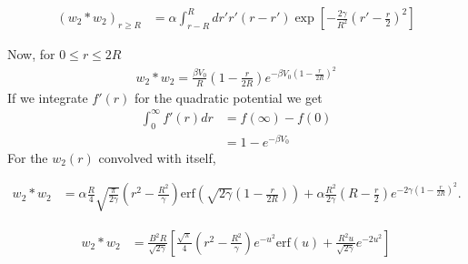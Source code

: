 \documentclass[letterpaper,twocolumn,amsmath,amssymb,prb]{revtex4-1}
\begin{document}
\begin{align}
(w_2 \ast w_2)_{r \geq R} &= \alpha \int_{r - R}^R dr' r'(r-r') \exp \left [ -
   \frac {2\gamma}{R^2}\left( r' - \frac{r}{2} \right)^2 \right]
\end{align}

Now, for $ 0 \leq r \leq 2R$
\begin{align}
  w_2 \ast w_2 = \frac{\beta V_0}{R} \left( 1 - \frac{r}{2R} \right)
              e^{-\beta V_0 \left( 1 - \frac{r}{2R} \right)^2}
\end{align}
If we integrate $f'(r)$ for the quadratic potential we get
\begin{align}
  \int_0^{\infty} f'(r)dr &= f(\infty) - f(0)\\
                    &= 1 - e^{-\beta V_0}
\end{align}
For the $w_2(r)$ convolved with itself,
\begin{widetext}
\begin{align*}
  w_2\ast w_2 &= \alpha \frac{R}{4}\sqrt{\frac{\pi}{2\gamma}}
               \left( r^2 - \frac{R^2}{\gamma}
               \right)\textrm{erf} \left( \sqrt{2\gamma} \left(1 - \frac{r}{2R}
               \right) \right)%
               + \alpha \frac{R^2}{2\gamma} \left( R - \frac{r}{2}
               \right) e^{-2\gamma \left( 1 - \frac{r}{2R} \right)^2}.
\end{align*}
\end{widetext}
\begin{align*}
  w_2\ast w_2 &= \frac{B^2 R}{\sqrt{2\gamma}} \left[
               \frac{\sqrt{\pi}}{4} \left( r^2 - \frac{R^2}{\gamma}
               \right) e^{-u^2} \textrm{erf}(u)
               + \frac{R^2 u}{\sqrt{2\gamma}}
               e^{-2u^2} \right]
\end{align*}
\end{document}
